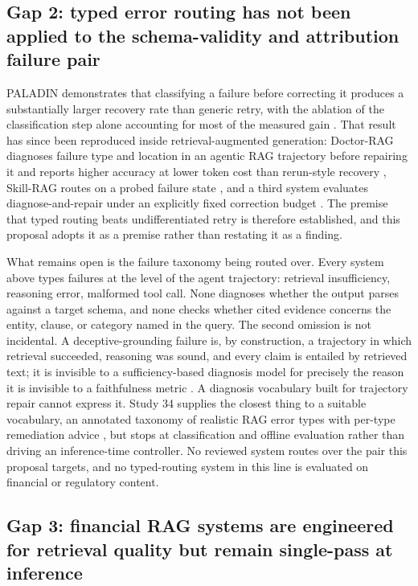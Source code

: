 \documentclass[10pt,twocolumn,letterpaper]{article}
\begin{document}
\subsection{Gap 2: typed error routing has not been applied to the schema-validity and attribution failure pair}

PALADIN demonstrates that classifying a failure before correcting it produces a substantially larger recovery rate than generic retry, with the ablation of the classification step alone accounting for most of the measured gain \cite{paladin}. That result has since been reproduced inside retrieval-augmented generation: Doctor-RAG diagnoses failure type and location in an agentic RAG trajectory before repairing it and reports higher accuracy at lower token cost than rerun-style recovery \cite{doctorrag}, Skill-RAG routes on a probed failure state \cite{skillrag}, and a third system evaluates diagnose-and-repair under an explicitly fixed correction budget \cite{budgetrepair}. The premise that typed routing beats undifferentiated retry is therefore established, and this proposal adopts it as a premise rather than restating it as a finding.

What remains open is the failure taxonomy being routed over. Every system above types failures at the level of the agent trajectory: retrieval insufficiency, reasoning error, malformed tool call. None diagnoses whether the output parses against a target schema, and none checks whether cited evidence concerns the entity, clause, or category named in the query. The second omission is not incidental. A deceptive-grounding failure is, by construction, a trajectory in which retrieval succeeded, reasoning was sound, and every claim is entailed by retrieved text; it is invisible to a sufficiency-based diagnosis model for precisely the reason it is invisible to a faithfulness metric \cite{deceptive}. A diagnosis vocabulary built for trajectory repair cannot express it. Study 34 supplies the closest thing to a suitable vocabulary, an annotated taxonomy of realistic RAG error types with per-type remediation advice \cite{ragerrors}, but stops at classification and offline evaluation rather than driving an inference-time controller. No reviewed system routes over the pair this proposal targets, and no typed-routing system in this line is evaluated on financial or regulatory content.

\subsection{Gap 3: financial RAG systems are engineered for retrieval quality but remain single-pass at inference}
\end{document}
